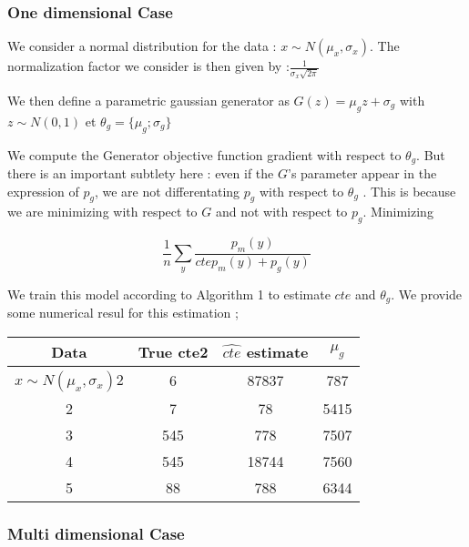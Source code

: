 \documentclass{article}
\begin{document}
\subsubsection{One dimensional Case}

We consider a normal distribution for the data : $ x \sim N(\mu_{x} , \sigma_{x} ) $. The normalization factor we consider is then given by :$ \frac{1}{\sigma_{x}\sqrt{2\pi}} $

We then define a parametric gaussian generator as  
 $G(z) = \mu_{g} z+\sigma_{g}$ with  $z \sim N(0,1) $ et  $\theta_{g} =  \{\mu _{g}; \sigma_{g}\}$

We compute the  Generator objective function gradient  with respect to   $\theta_{g}$.  But there is an important subtlety  here : even if the $G$'s parameter appear in the expression of $p_{g}$,  we are not differentating  $p_{g}$ with respect to $\theta_{g}$ . This is because we are minimizing with respect to $G$ and not with respect to $p_{g}$. Minimizing  
 
\begin{equation}
 \frac{1}{n}\sum_{y} \frac{ p_{m}(y)}{ctep_{m}(y)+p_{g}(y)}  
\end{equation}


We train this model  according to Algorithm 1 to estimate $cte$ and  $\theta_{g}$.  We provide some numerical resul for this estimation ;

\begin{center}
 \begin{tabular}{||c c c c||} 
 \hline
 Data & True cte2 & $\hat{cte}$ estimate & $\mu _{g}$  \\ [0.5ex] 
 \hline\hline
  $ x \sim N(\mu_{x} , \sigma_{x} ) $2 & 6 & 87837 & 787 \\ 
 \hline
 2 & 7 & 78 & 5415 \\
 \hline
 3 & 545 & 778 & 7507 \\
 \hline
 4 & 545 & 18744 & 7560 \\
 \hline
 5 & 88 & 788 & 6344 \\ [1ex] 
 \hline
\end{tabular}
\end{center}

\subsubsection{Multi dimensional  Case }
\end{document}

